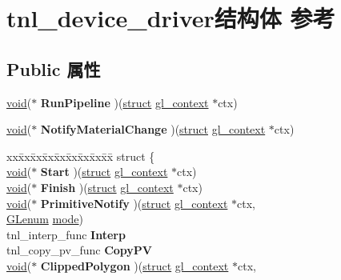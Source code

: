\hypertarget{structtnl__device__driver}{}\section{tnl\+\_\+device\+\_\+driver结构体 参考}
\label{structtnl__device__driver}
\subsection*{Public 属性}
\begin{DoxyCompactItemize}
\item 
\mbox{\label{structtnl__device__driver_a135e606aa1e761b0b2f64e56590fc2dc}} 
\hyperlink{interfacevoid}{void}($\ast$ {\bfseries Run\+Pipeline} )(\hyperlink{interfacestruct}{struct} \hyperlink{structgl__context}{gl\+\_\+context} $\ast$ctx)
\item 
\mbox{\label{structtnl__device__driver_ae3e6cbc39e120daf6fb3a41bc6bb9a78}} 
\hyperlink{interfacevoid}{void}($\ast$ {\bfseries Notify\+Material\+Change} )(\hyperlink{interfacestruct}{struct} \hyperlink{structgl__context}{gl\+\_\+context} $\ast$ctx)
\item 
\mbox{\label{structtnl__device__driver_a548ce4ac44c3b0b3c9167b0c35962fd1}} 
\begin{tabbing}
xx\=xx\=xx\=xx\=xx\=xx\=xx\=xx\=xx\=\kill
struct \{\\
\>\hyperlink{interfacevoid}{void}($\ast$ {\bfseries Start} )(\hyperlink{interfacestruct}{struct} \hyperlink{structgl__context}{gl\_context} $\ast$ctx)\\
\>\hyperlink{interfacevoid}{void}($\ast$ {\bfseries Finish} )(\hyperlink{interfacestruct}{struct} \hyperlink{structgl__context}{gl\_context} $\ast$ctx)\\
\>\hyperlink{interfacevoid}{void}($\ast$ {\bfseries PrimitiveNotify} )(\hyperlink{interfacestruct}{struct} \hyperlink{structgl__context}{gl\_context} $\ast$ctx, \\
\>\>\hyperlink{interfacevoid}{GLenum} \hyperlink{interfacevoid}{mode})\\
\>tnl\_interp\_func {\bfseries Interp}\\
\>tnl\_copy\_pv\_func {\bfseries CopyPV}\\
\>\hyperlink{interfacevoid}{void}($\ast$ {\bfseries ClippedPolygon} )(\hyperlink{interfacestruct}{struct} \hyperlink{structgl__context}{gl\_context} $\ast$ctx, \\

\end{tabbing}
\end{DoxyCompactItemize}
